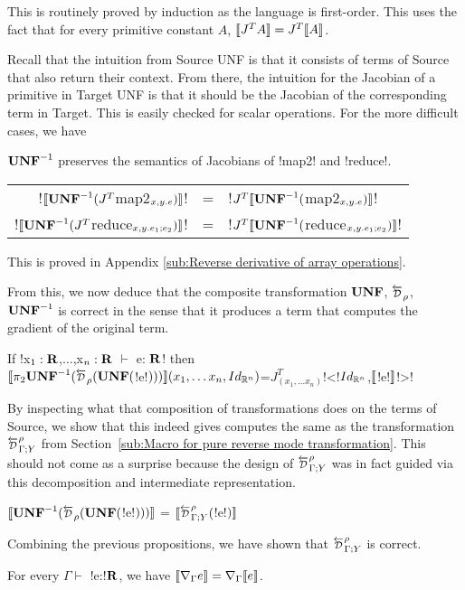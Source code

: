 This is routinely proved by induction as the language is first-order. 
This uses the fact that for every primitive constant $A$, $\llbracket J^TA\rrbracket=J^T\llbracket A\rrbracket$.

Recall that the intuition from Source UNF is that it consists of terms of Source that also return their context.
From there, the intuition for the Jacobian of a primitive in Target UNF is that it should be the Jacobian of
the corresponding term in Target. This is easily checked for scalar operations. For the more difficult cases, we have 

\begin{proposition}
$\mathbf{UNF}^{-1}$ preserves the semantics of Jacobians of !map2! and !reduce!.
    \begin{center}
\begin{tabular}{r c l}
    !$\llbracket\mathbf{UNF}^{-1}(J^T$map2$_{x,y.e})\rrbracket$! &=& !$J^T\llbracket\mathbf{UNF}^{-1}($map2$_{x,y.e})\rrbracket$!\\
    !$\llbracket\mathbf{UNF}^{-1}(J^T$reduce$_{x,y.e_1;e_2})\rrbracket$! &=& !$J^T\llbracket\mathbf{UNF}^{-1}($reduce$_{x,y.e_1;e_2})\rrbracket$!
\end{tabular}
\end{center}
\end{proposition}

This is proved in Appendix \ref{sub:Reverse derivative of array operations}.

From this, we now deduce that the composite transformation $\mathbf{UNF}$, $\Dsynrevsymbol_{\rho}$, $\mathbf{UNF}^{-1}$ is correct
in the sense that it produces a term that computes the gradient of the original term.

\begin{proposition}
    If !x$_1:\mathbf{R}$,$\ldots$,x$_n:\mathbf{R}$ $\vdash$ e: $\mathbf{R}$! then \\
    $\seml \pi_2 \UNFSymbol^{-1}(\Dsynrevsymbol_{\rho}(\UNFSymbol($!e!$)))\rrbracket(x_1,\ldots x_n,Id_{\mathbb{R}^n})$=$J^T_{(x_1,\ldots x_n)}$!<!$Id_{\mathbb{R}^n}$,$\llbracket$!e!$\rrbracket$!>!
\end{proposition}

By inspecting what that composition of transformations does on the terms of Source, 
we show that this indeed gives computes the same as the transformation 
$\directD{\rho}{\Gamma}{Y}$ from Section~\ref{sub:Macro for pure reverse mode transformation}. 
This should not come as a surprise because the design of $\directD{\rho}{\Gamma}{Y}$ was in fact guided via 
this decomposition and intermediate representation.

\begin{proposition}
    $\seml\UNFSymbol^{-1}(\Dsynrevsymbol_{\rho}(\UNFSymbol($!e!$)))\rrbracket$ = $\seml\directD{\rho}{\Gamma}{Y}($!e!$)\rrbracket$ 
\end{proposition}

Combining the previous propositions, we have shown that $\directD{\rho}{\Gamma}{Y}$ is correct.

\begin{theorem}
    For every $\Gamma \vdash$ !e:!$\mathbf{R}$, we have 
    $\llbracket \nabla_\Gamma e\rrbracket= \nabla_\Gamma\llbracket e\rrbracket$.
\end{theorem}